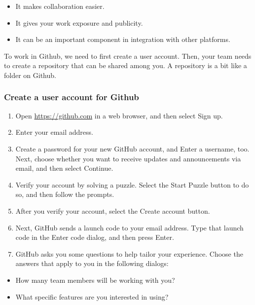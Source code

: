 \documentclass[
]{article}
\providecommand{\tightlist}{%
  \setlength{\itemsep}{0pt}\setlength{\parskip}{0pt}}
\begin{document}
\begin{itemize}
\tightlist
\item
  It makes collaboration easier.
\item
  It gives your work exposure and publicity.
\item
  It can be an important component in integration with other platforms.
\end{itemize}

To work in Github, we need to first create a user account. Then, your
team needs to create a repository that can be shared among you. A
repository is a bit like a folder on Github.

\hypertarget{create-a-user-account-for-github}{%
\subsubsection{Create a user account for
Github}\label{create-a-user-account-for-github}}

\begin{enumerate}
\def\labelenumi{\arabic{enumi}.}
\tightlist
\item
  Open \url{https://github.com} in a web browser, and then select Sign
  up.
\item
  Enter your email address.
\item
  Create a password for your new GitHub account, and Enter a username,
  too. Next, choose whether you want to receive updates and
  announcements via email, and then select Continue.
\item
  Verify your account by solving a puzzle. Select the Start Puzzle
  button to do so, and then follow the prompts.
\item
  After you verify your account, select the Create account button.
\item
  Next, GitHub sends a launch code to your email address. Type that
  launch code in the Enter code dialog, and then press Enter.
\item
  GitHub asks you some questions to help tailor your experience. Choose
  the answers that apply to you in the following dialogs:
\end{enumerate}

\begin{itemize}
\tightlist
\item
  How many team members will be working with you?
\item
  What specific features are you interested in using?
\end{itemize}
\end{document}

